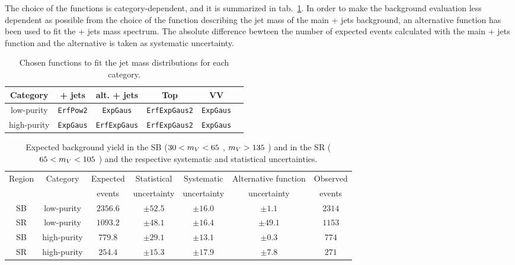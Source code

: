 \noindent The choice of the functions is category-dependent, and it is summarized in tab.~\ref{tab:MassFunctions}. In order to make the background evaluation less dependent as possible from the choice of the function describing the jet mass of the main \V + jets background, an alternative function has been used to fit the \V + jets mass spectrum. The absolute difference bewteen the number of expected events calculated with the main \V + jets function and the alternative is taken as systematic uncertainty.

\begin{table}[!htb]
  \begin{center}
  \caption{Chosen functions to fit the jet mass distributions for each category.}\label{tab:MassFunctions}
    \begin{tabular}{c|ccccc}
      Category & \V + jets & alt. \V + jets & Top & VV \\
      \hline
      \hline
      low-purity  & {\tt ErfPow2} & {\tt ExpGaus} & {\tt ErfExpGaus2} & {\tt ExpGaus} \\ 
      \hdashline
      high-purity & {\tt ExpGaus} & {\tt ErfExpGaus} & {\tt ErfExpGaus2} & {\tt ExpGaus} \\
    \end{tabular}
  \end{center}

\end{table}

\begin{table}[!htb]
  \begin{center}
  \caption{Expected background yield in the SB ($30 < m_V < 65$ \GeV, $m_V > 135$ \GeV) and in the SR ($65 < m_V < 105$ \GeV) and the respective systematic and statistical uncertainties.}\label{tab:BkgNorm}
    \begin{tabular}{cc|c|ccc|c}
      Region & Category   & Expected & Statistical       & Systematic     & Alternative function& Observed \\
       &  & events & uncertainty       & uncertainty     & uncertainty & events\\
      \hline
      \hline
      SB     & low-purity & $2356.6$ & $\pm 52.5$ & $\pm 16.0$ & $\pm 1.1$    & $2314$ \\
      SR     & low-purity & $1093.2$  & $\pm 48.1$ & $\pm 16.4$ & $\pm 49.1$   & $1153$ \\
      \hdashline
      SB & high-purity    & $779.8$  & $\pm 29.1$ & $\pm 13.1$ & $\pm 0.3$  & $774$ \\
      SR & high-purity    & $254.4$  & $\pm 15.3$ & $\pm 17.9$ & $\pm 7.8$  & $271$ \\
    \end{tabular}
  \end{center}

\end{table}

